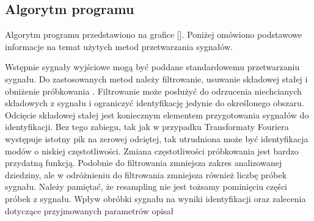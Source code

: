 \subsection{Algorytm programu}

Algorytm programu przedstawiono na grafice [].
Poniżej omówiono podstawowe informacje na temat użytych metod przetwarzania sygnałów.

Wstępnie sygnały wyjściowe mogą być poddane standardowemu przetwarzaniu sygnału. Do zastosowanych metod należy filtrowanie, usuwanie składowej stałej i obniżenie próbkowania . Filtrowanie może posłużyć do odrzucenia niechcianych składowych z sygnału i ograniczyć identyfikację jedynie do określonego obszaru. Odcięcie składowej stałej jest koniecznym elementem przygotowania sygnałów do identyfikacji. Bez tego zabiegu, tak jak w przypadku Transformaty Fouriera występuje istotny pik na zerowej odciętej, tak utrudniona może być identyfikacja modów o niskiej częstotliwości. Zmiana częstotliwości próbkowania jest bardzo przydatną funkcją. Podobnie do filtrowania zmniejsza zakres analizowanej dziedziny, ale w odróżnieniu do filtrowania zmniejsza również liczbę próbek sygnału. Należy pamiętać, że resampling nie jest tożsamy pominięciu części próbek z sygnału. Wpływ obróbki sygnału na wyniki identyfikacji oraz zalecenia dotyczące przyjmowanych parametrów opisał \cite{Caicedo2011} 


